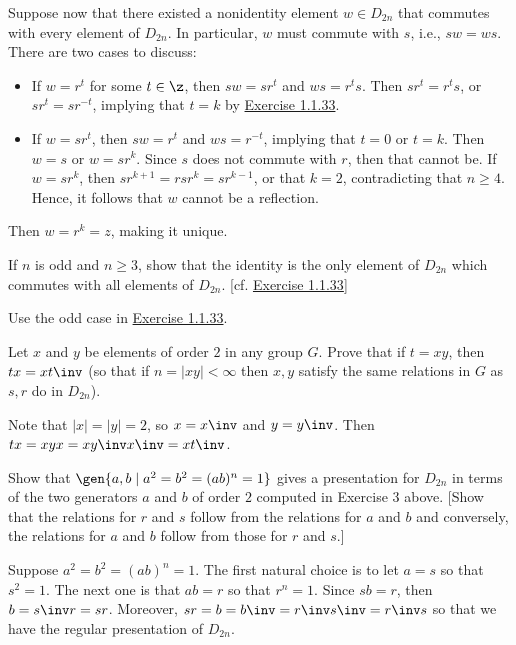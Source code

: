 \begin{problems}
\begin{sol}
        Suppose now that there existed a nonidentity element $w \in D_{2n}$ that commutes with every element of $D_{2n}$. In particular, $w$ must commute with $s$, i.e., $sw = ws$. There are two cases to discuss:
        \begin{itemize}
            \item If $w = r^t$ for some $t \in \z$, then $sw = sr^t$ and $ws = r^ts$. Then $sr^t = r^ts$, or $sr^t = sr^{-t}$, implying that $t = k$ by \hyperref[ex1.1.33]{Exercise 1.1.33}.
            \item If $w = sr^t$, then $sw = r^t$ and $ws = r^{-t}$, implying that $t = 0$ or $t = k$. Then $w = s$ or $w = sr^k$. Since $s$ does not commute with $r$, then that cannot be. If $w = sr^k$, then $sr^{k + 1} = rsr^k = sr^{k - 1}$, or that $k = 2$, contradicting that $n \geq 4$. Hence, it follows that $w$ cannot be a reflection.
        \end{itemize}
        Then $w = r^k = z$, making it unique.
    \end{sol}
    \item If $n$ is odd and $n \geq 3$, show that the identity is the only element of $D_{2n}$ which commutes with all elements of $D_{2n}$. [cf. \hyperref[ex1.1.33]{Exercise 1.1.33}]
    \begin{sol}
        Use the odd case in \hyperref[ex1.1.33]{Exercise 1.1.33}.
    \end{sol}
    \item Let $x$ and $y$ be elements of order $2$ in any group $G$. Prove that if $t = xy$, then $tx = xt\inv$ (so that if $n = |xy| < \infty$ then $x, y$ satisfy the same relations in $G$ as $s, r$ do in $D_{2n}$).
    \begin{sol}
        Note that $|x| = |y| = 2$, so $x = x\inv$ and $y = y\inv$. Then $tx = xyx = xy\inv x\inv = xt\inv$.
    \end{sol}
    \item Show that $\gen{a, b \mid a^2 = b^2 = (ab)^n = 1}$ gives a presentation for $D_{2n}$ in terms of the two generators $a$ and $b$ of order $2$ computed in Exercise 3 above. [Show that the relations for $r$ and $s$ follow from the relations for $a$ and $b$ and conversely, the relations for $a$ and $b$ follow from those for $r$ and $s$.]
    \begin{sol}
        Suppose $a^2 = b^2 = (ab)^n = 1$. The first natural choice is to let $a = s$ so that $s^2 = 1$. The next one is that $ab = r$ so that $r^n = 1$. Since $sb = r$, then $b = s\inv r = sr$. Moreover, $sr = b = b\inv = r\inv s\inv = r\inv s$ so that we have the regular presentation of $D_{2n}$. 
        

\end{sol}
\end{problems}
